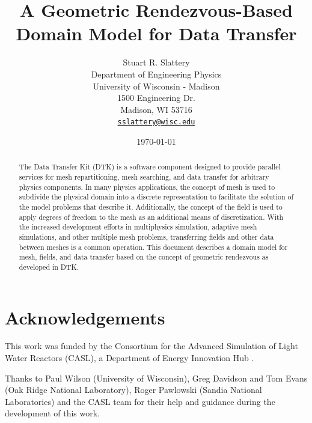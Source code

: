 \documentclass[letterpaper,12pt]{article}
\author{
  Stuart R. Slattery\\
  Department of Engineering Physics\\
  University of Wisconsin - Madison\\
  1500 Engineering Dr.\\
  Madison, WI 53716 \\
  \href{mailto:sslattery@wisc.edu}{\texttt{sslattery@wisc.edu}}
}
\date{\today}
\title{A Geometric Rendezvous-Based Domain Model for Data Transfer}
\begin{document}
\maketitle

\newpage

\begin{abstract}
  The Data Transfer Kit (DTK) is a software component designed to
  provide parallel services for mesh repartitioning, mesh searching,
  and data transfer for arbitrary physics components. In many physics
  applications, the concept of mesh is used to subdivide the physical
  domain into a discrete representation to facilitate the solution of
  the model problems that describe it. Additionally, the concept of
  the field is used to apply degrees of freedom to the mesh as an
  additional means of discretization. With the increased development
  efforts in multiphysics simulation, adaptive mesh simulations, and
  other multiple mesh problems, transferring fields and other data
  between meshes is a common operation. This document describes a
  domain model for mesh, fields, and data transfer based on the
  concept of geometric rendezvous as developed in DTK.
\end{abstract}

\newpage

\section*{Acknowledgements}
This work was funded by the Consortium for the Advanced Simulation of
Light Water Reactors (CASL), a Department of Energy Innovation Hub
\cite{CASL_web}.

Thanks to Paul Wilson (University of Wisconsin), Greg Davidson and Tom
Evans (Oak Ridge National Laboratory), Roger Pawlowski (Sandia
National Laboratories) and the CASL team for their help and guidance
during the development of this work.


\newpage

\tableofcontents
\clearpage
\listoffigures
\clearpage
\listoftables
\newpage
\newpage

\end{document}
